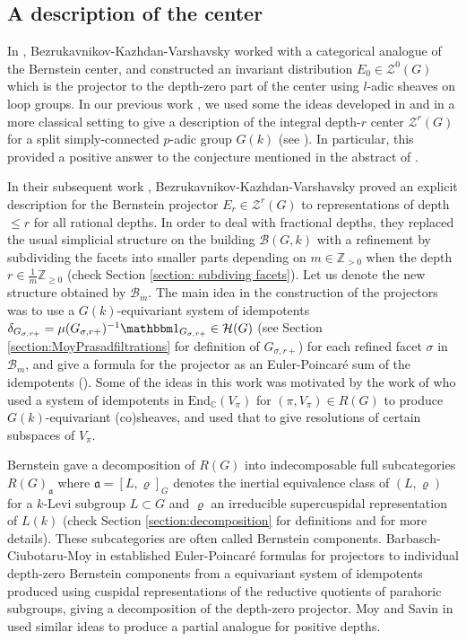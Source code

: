 \documentclass[11 pt]{article}
\numberwithin{equation}{subsection}
\theoremstyle{definition}
\theoremstyle{remark}
\theoremstyle{conjecture}
\newcommand{\mbm}{\mathbbm}
\newcommand{\Z}{\mathbb Z}
\newcommand{\C}{\mathbb C}
\newcommand{\HH}{\mathcal H}
\newcommand{\mf}{\mathfrak}
\newcommand{\B}{\mathcal{B}}
\newcommand{\ZZ}{\mathcal{Z}}
\begin{document}
\subsection{A description of the center}
 In \cite{BKV}, Bezrukavnikov-Kazhdan-Varshavsky worked with a categorical analogue of the Bernstein center, and constructed an invariant distribution $E_0 \in \ZZ^0(G)$ which is the projector to the depth-zero part of the center using $l$-adic sheaves on loop groups. In our previous work \cite{cb24}, we used some the ideas developed in \cite{BKV} and \cite{chendepthzerostable} in a more classical setting to give a description of the integral depth-$r$ center $\ZZ^r(G)$ for a split simply-connected $p$-adic group $G(k)$ (see \cite[Theorem 2.8, Theorem 3.11]{cb24}). In particular, this provided a positive answer to the conjecture mentioned in the abstract of \cite{chendepthzerostable}.\par 
 In their subsequent work \cite{BKV2}, Bezrukavnikov-Kazhdan-Varshavsky proved an explicit description for the Bernstein projector $ E_r\in \ZZ^r(G)$ to representations of depth $\leq r$ for all rational depths. In order to deal with fractional depths, they replaced the usual simplicial structure on the building $\B(G,k)$ with a refinement by subdividing the facets into smaller parts depending on $m \in \Z_{>0}$ when the depth $r \in \frac{1}{m}\Z_{\geq 0}$ (check Section \ref{section: subdiving facets}). Let us denote the new structure obtained by $\B_m$. The main idea in the construction of the projectors was to use a $G(k)$-equivariant system of idempotents $\delta_{G_{\sigma,r+}}= \mu(G_{\sigma,r+})^{-1}\mbm 1_{G_{\sigma,r+}} \in \HH(G)$ (see Section \ref{section:MoyPrasadfiltrations} for definition of $G_{\sigma,r+}$) for each refined facet $\sigma$ in $\B_m$, and give a formula for the projector as an Euler-Poincar\'e sum of the idempotents (\cite[Theorem 1.6]{BKV2}). Some of the ideas in this work was motivated by the work of \cite{MeyerSolleveld} who used a system of idempotents in $\mathrm{End}_\C(V_\pi)$ for $(\pi,V_\pi) \in R(G)$ to produce $G(k)$-equivariant (co)sheaves, and used that to give resolutions of certain subspaces of $V_\pi$.\par
 Bernstein gave a decomposition of $R(G)$ into indecomposable full subcategories $R(G)_{\mf a}$ where $\mf a =[L,\varrho]_G$ denotes the inertial equivalence class of $(L,\varrho)$ for a $k$-Levi subgroup $L \subset G$ and $\varrho$ an irreducible supercuspidal representation of $L(k)$ (check Section \ref{section:decomposition} for definitions and \cite{roche2009bernstein} for more details). These subcategories are often called Bernstein components. Barbasch-Ciubotaru-Moy in \cite{barbaschciubotarumoy} established Euler-Poincar\'e formulas for projectors to individual depth-zero Bernstein components from a equivariant system of idempotents produced using cuspidal representations of the reductive quotients of parahoric subgroups, giving a decomposition of the depth-zero projector. Moy and Savin in \cite{moysavin} used similar ideas to produce a partial analogue for positive depths. \par
\end{document}
